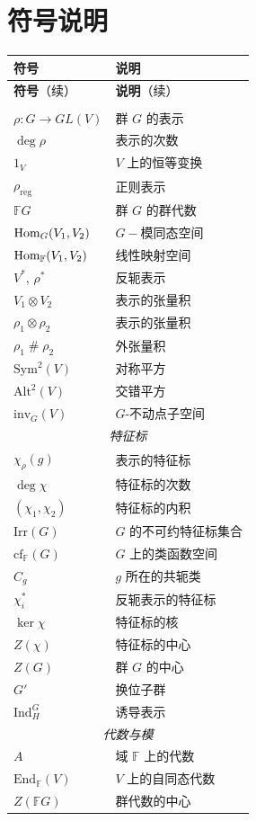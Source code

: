 \chapter*{符号说明}
{\small
\setlength{\tabcolsep}{6pt}
\renewcommand{\arraystretch}{1.2}
\begin{longtable}{p{3.2cm}p{\dimexpr\linewidth-3.4cm-4\tabcolsep\relax}}
    \hline
    \textbf{符号} & \textbf{说明} \\
    \hline
    \endfirsthead
    \hline
    \textbf{符号}（续） & \textbf{说明}（续） \\
    \hline
    \endhead
    \hline
    \endfoot
    \multicolumn{2}{c}{\textit{群与表示}} \\ \hline
    $\rho:G\to GL(V)$ & 群 $G$ 的表示 \\
    $\deg\rho$ & 表示的次数 \\
    $1_V$ & $V$ 上的恒等变换 \\
    $\rho_{\mathrm{reg}}$ & 正则表示 \\
    $\mathbb{F}G$ & 群 $G$ 的群代数 \\
    $\operatorname{Hom}_G(V_1,V_2)$ & $G-\!\!$模同态空间 \\
    $\operatorname{Hom}_{\mathbb{F}}(V_1,V_2)$ & 线性映射空间 \\
    $V^*$, $\rho^*$ & 反轭表示 \\
    $V_1\otimes V_2$ & 表示的张量积 \\
    $\rho_1\otimes\rho_2$ & 表示的张量积 \\
    $\rho_1\mathbin{\#}\rho_2$ & 外张量积 \\
    $\mathrm{Sym}^2(V)$ & 对称平方 \\
    $\mathrm{Alt}^2(V)$ & 交错平方 \\
    $\mathrm{inv}_G(V)$ & $G$-不动点子空间 \\ \hline
    \multicolumn{2}{c}{\textit{特征标}} \\ \hline
    $\chi_\rho(g)$ & 表示的特征标 \\
    $\deg\chi$ & 特征标的次数 \\
    $(\chi_1,\chi_2)$ & 特征标的内积 \\
    $\mathrm{Irr}(G)$ & $G$ 的不可约特征标集合 \\
    $\mathrm{cf}_{\mathbb{F}}(G)$ & $G$ 上的类函数空间 \\
    $C_g$ & $g$ 所在的共轭类 \\
    $\chi_i^*$ & 反轭表示的特征标 \\
    $\ker\chi$ & 特征标的核 \\
    $Z(\chi)$ & 特征标的中心 \\
    $Z(G)$ & 群 $G$ 的中心 \\
    $G'$ & 换位子群 \\
    $\mathrm{Ind}_H^G$ & 诱导表示 \\ \hline
    \multicolumn{2}{c}{\textit{代数与模}} \\ \hline
    $A$ & 域 $\mathbb{F}$ 上的代数 \\
    $\mathrm{End}_{\mathbb{F}}(V)$ & $V$ 上的自同态代数 \\
    $Z(\mathbb{F}G)$ & 群代数的中心 \\ \hline
\end{longtable}
}